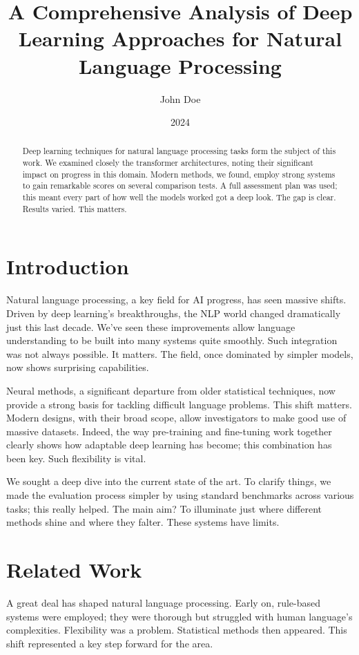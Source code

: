 \documentclass{article}
\title{A Comprehensive Analysis of Deep Learning Approaches for Natural Language Processing}
\author{John Doe}
\date{2024}
\begin{document}
\maketitle

\begin{abstract}
Deep learning techniques for natural language processing tasks form the subject of this work. We examined closely the transformer architectures, noting their significant impact on progress in this domain. Modern methods, we found, employ strong systems to gain remarkable scores on several comparison tests. A full assessment plan was used; this meant every part of how well the models worked got a deep look. The gap is clear. Results varied. This matters.
\end{abstract}

\section{Introduction}

Natural language processing, a key field for AI progress, has seen massive shifts. Driven by deep learning's breakthroughs, the NLP world changed dramatically just this last decade. We've seen these improvements allow language understanding to be built into many systems quite smoothly. Such integration was not always possible. It matters. The field, once dominated by simpler models, now shows surprising capabilities.

Neural methods, a significant departure from older statistical techniques, now provide a strong basis for tackling difficult language problems. This shift matters. Modern designs, with their broad scope, allow investigators to make good use of massive datasets. Indeed, the way pre-training and fine-tuning work together clearly shows how adaptable deep learning has become; this combination has been key. Such flexibility is vital.

We sought a deep dive into the current state of the art. To clarify things, we made the evaluation process simpler by using standard benchmarks across various tasks; this really helped. The main aim? To illuminate just where different methods shine and where they falter. These systems have limits.

\section{Related Work}

A great deal has shaped natural language processing. Early on, rule-based systems were employed; they were thorough but struggled with human language's complexities. Flexibility was a problem. Statistical methods then appeared. This shift represented a key step forward for the area.
\end{document}

